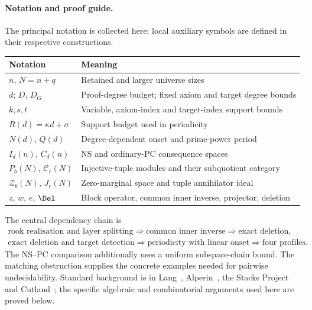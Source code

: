 \paragraph{Notation and proof guide.}\label{sec:specialist-tools}
The principal notation is collected here; local auxiliary symbols are
defined in their respective constructions.
\begin{center}
\begin{tabular}{@{}ll@{}}
\toprule
Notation & Meaning\\
\midrule
$n$, $N=n+q$ & Retained and larger universe sizes\\
$d$; $D$, $D_G$ & Proof-degree budget; fixed axiom and target degree bounds\\
$k,s,t$ & Variable, axiom-index and target-index support bounds\\
$R(d)=\kappa d+\sigma$ & Support budget used in periodicity\\
$N(d)$, $Q(d)$ & Degree-dependent onset and prime-power period\\
$I_d(n)$, $C_d(n)$ & NS and ordinary-PC consequence spaces\\
$P_b(N)$, $\mathcal C_r(N)$ & Injective-tuple modules and their subquotient category\\
$\mathcal Z_b(N)$, $J_r(N)$ & Zero-marginal space and tuple annihilator ideal\\
$z$, $w$, $e$, $\Del$ & Block operator, common inner inverse, projector, deletion\\
\bottomrule
\end{tabular}
\end{center}
The central dependency chain is
\[
 \begin{gathered}
 \text{rook realisation and layer splitting}\Longrightarrow
 \text{common inner inverse}\Longrightarrow\text{exact deletion},\\
 \text{exact deletion and target detection}\Longrightarrow
 \text{periodicity with linear onset}\Longrightarrow\text{four profiles}.
 \end{gathered}
\]
The NS--PC comparison additionally uses a uniform subspace-chain bound.
The matching obstruction supplies the concrete examples needed for
pairwise undecidability. Standard background is in Lang~\cite{LangAlgebra},
Alperin~\cite{AlperinLocal}, the Stacks Project~\cite{StacksExact} and
Cutland~\cite{Cutland}; the specific algebraic and combinatorial
arguments used here are proved below.

